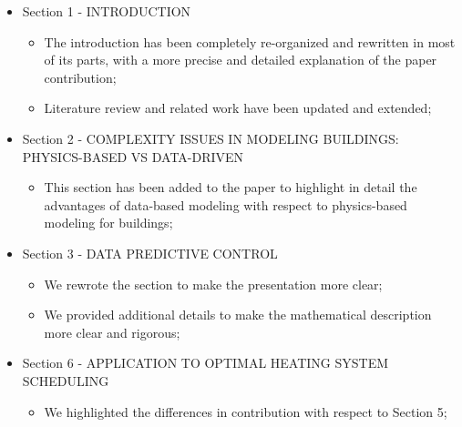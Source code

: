 \documentclass{article}
\begin{document}
\begin{itemize}



	\item Section 1 - INTRODUCTION

	\begin{itemize}

		\item The introduction has been completely re-organized and rewritten in most of its parts, with a more precise and detailed explanation of the paper contribution;

		\item Literature review and related work have been updated and extended;

	\end{itemize}



	\item Section 2 - COMPLEXITY ISSUES IN MODELING BUILDINGS: PHYSICS-BASED VS DATA-DRIVEN

	\begin{itemize}

		\item This section has been added to the paper to highlight in detail the advantages of data-based modeling with respect to physics-based modeling for buildings;

	\end{itemize}



	\item Section 3 - DATA PREDICTIVE CONTROL

	\begin{itemize}

		\item We rewrote the section to make the presentation more clear;

		\item We provided additional details to make the mathematical  description more clear and rigorous;

	\end{itemize}



	\item Section 6 - APPLICATION TO OPTIMAL HEATING SYSTEM SCHEDULING

	\begin{itemize}

		\item We highlighted the differences in contribution with respect to Section 5;


\end{itemize}
\end{itemize}
\end{document}
